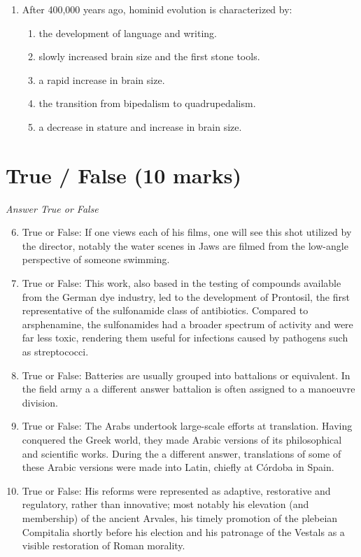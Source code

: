 \documentclass[12pt]{article}
\begin{document}
\begin{enumerate}[label=\arabic*.]
\begin{enumerate}[label=(\alph*)]
    \item domesticated animals.
\end{enumerate}
\item After 400,000 years ago, hominid evolution is characterized by:
\begin{enumerate}[label=(\alph*)]
    \item the development of language and writing.
    \item slowly increased brain size and the first stone tools.
    \item a rapid increase in brain size.
    \item the transition from bipedalism to quadrupedalism.
    \item a decrease in stature and increase in brain size.
\end{enumerate}
\end{enumerate}

\section*{True / False (10 marks)}
\textit{Answer True or False}
\begin{enumerate}[label=\arabic*.]
\setcounter{enumi}{5}
\item True or False: If one views each of his films, one will see this shot utilized by the director, notably the water scenes in Jaws are filmed from the low-angle perspective of someone swimming.
\item True or False: This work, also based in the testing of compounds available from the German dye industry, led to the development of Prontosil, the first representative of the sulfonamide class of antibiotics. Compared to arsphenamine, the sulfonamides had a broader spectrum of activity and were far less toxic, rendering them useful for infections caused by pathogens such as streptococci.
\item True or False: Batteries are usually grouped into battalions or equivalent. In the field army a a different answer battalion is often assigned to a manoeuvre division.
\item True or False: The Arabs undertook large-scale efforts at translation. Having conquered the Greek world, they made Arabic versions of its philosophical and scientific works. During the a different answer, translations of some of these Arabic versions were made into Latin, chiefly at Córdoba in Spain.
\item True or False: His reforms were represented as adaptive, restorative and regulatory, rather than innovative; most notably his elevation (and membership) of the ancient Arvales, his timely promotion of the plebeian Compitalia shortly before his election and his patronage of the Vestals as a visible restoration of Roman morality.
\end{enumerate}
\end{document}
